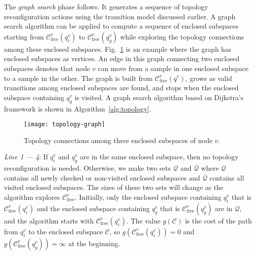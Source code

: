 \documentclass[journal]{IEEEtran}
\begin{document}
The \textit{graph search} phase follows. It generates a sequence of
topology reconfiguration actions using the transition model discussed
earlier. A graph search algorithm can be applied to compute a sequence
of enclosed subspaces starting from
$\mathcal{C}_{\mathrm{free}}^v(q_i^v)$ to
$\mathcal{C}_{\mathrm{free}}^v(q_g^v)$ while exploring the topology
connections among these enclosed subspaces.
Fig.~\ref{fig:topology-graph} is an example where the graph has
enclosed subspaces as vertices. An edge in this graph connecting two
enclosed subspaces denotes that node $v$ can move from a sample in one
enclosed subspace to a sample in the other. The graph is built from
$\mathcal{C}_{\mathrm{free}}^v(q^v)$, grows as valid transitions among
enclosed subspaces are found, and stops when the enclosed subspace
containing $q_g^v$ is visited. A graph search algorithm based on
Dijkstra's framework is shown in Algorithm~\ref{alg:topology}.

\begin{figure}[t]
  \centering
  \texttt{[image: topology-graph]}
  \caption{Topology connections among three enclosed subspaces of node
  $v$.}
  \label{fig:topology-graph}
\end{figure}

\textit{Line 1 --- 4}: If $q_i^v$ and $q_g^v$ are in the same enclosed
subspace, then no topology reconfiguration is needed. Otherwise, we
make two sets $\mathcal{Q}$ and $\overline{\mathcal{Q}}$ where
$\mathcal{Q}$ contains all newly checked or non-visited enclosed
subspaces and $\overline{\mathcal{Q}}$ contains all visited enclosed
subspaces. The sizes of these two sets will change as the algorithm
explores $\mathcal{C}_{\mathrm{free}}^v$. Initially, only the enclosed
subspace containing $q_i^v$ that is
$\mathcal{C}_{\mathrm{free}}^v(q_i^v)$ and the enclosed subspace
containing $q_g^v$ that is $\mathcal{C}_{\mathrm{free}}^v(q_g^v)$ are
in $\mathcal{Q}$, and the algorithm starts with
$\mathcal{C}_{\mathrm{free}}^v(q_i^v)$. The value $g(\mathcal{C})$ is
the cost of the path from $q_i^v$ to the enclosed subspace
$\mathcal{C}$, so $g(\mathcal{C}_{\mathrm{free}}^v(q_i^v)) = 0$ and
$g(\mathcal{C}_{\mathrm{free}}^v(q_g^v)) = \infty$ at the beginning.
\end{document}
